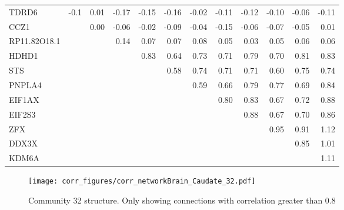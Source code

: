 \begin{longtable}{lrrrrrrrrrrr}
\bottomrule
\endlastfoot
TDRD6        &       -0.1 &               0.01 &       -0.17 &     -0.15 &        -0.16 &        -0.02 &        -0.11 &     -0.12 &       -0.10 &       -0.06 &       -0.11 \\
CCZ1         &            &               0.00 &       -0.06 &     -0.02 &        -0.09 &        -0.04 &        -0.15 &     -0.06 &       -0.07 &       -0.05 &        0.01 \\
RP11.82O18.1 &            &                    &        0.14 &      0.07 &         0.07 &         0.08 &         0.05 &      0.03 &        0.05 &        0.06 &        0.06 \\
HDHD1        &            &                    &             &      0.83 &         0.64 &         0.73 &         0.71 &      0.79 &        0.70 &        0.81 &        0.83 \\
STS          &            &                    &             &           &         0.58 &         0.74 &         0.71 &      0.71 &        0.60 &        0.75 &        0.74 \\
PNPLA4       &            &                    &             &           &              &         0.59 &         0.66 &      0.79 &        0.77 &        0.69 &        0.84 \\
EIF1AX       &            &                    &             &           &              &              &         0.80 &      0.83 &        0.67 &        0.72 &        0.88 \\
EIF2S3       &            &                    &             &           &              &              &              &      0.88 &        0.67 &        0.70 &        0.86 \\
ZFX          &            &                    &             &           &              &              &              &           &        0.95 &        0.91 &        1.12 \\
DDX3X        &            &                    &             &           &              &              &              &           &             &        0.85 &        1.01 \\
KDM6A        &            &                    &             &           &              &              &              &           &             &             &        1.11 \\
\end{longtable}


\begin{figure}[h!]
\centering
\texttt{[image: corr\_figures/corr\_networkBrain\_Caudate\_32.pdf]}
\caption{Community 32 structure. Only showing connections with correlation greater than 0.8}
\end{figure}


